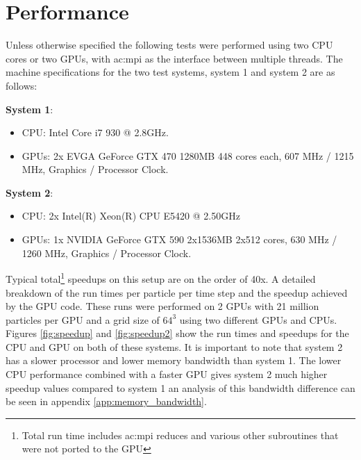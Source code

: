 \chapter{Performance}
\label{ch:performance} 
	Unless otherwise specified the following tests were performed using two CPU cores or two GPUs, with \gls{ac:mpi} as the interface between multiple threads. The machine specifications for the two test systems, system 1 and system 2 are as follows:
\begin{description}
	\item \textbf{System 1}:
			\begin{itemize}
				\item CPU: Intel Core i7 930 @ 2.8GHz.
				\item GPUs: 2x EVGA GeForce GTX 470 1280MB 448 cores each, 607 MHz / 1215 MHz, Graphics / Processor Clock.
			\end{itemize}
	\item \textbf{System 2}:
			\begin{itemize}
				\item CPU: 2x  Intel(R) Xeon(R) CPU E5420 @ 2.50GHz
				\item GPUs: 1x NVIDIA GeForce GTX 590 2x1536MB 2x512 cores, 630 MHz / 1260 MHz, Graphics / Processor Clock.
			\end{itemize}
 
\end{description}



Typical total\footnote[1]{Total run time includes \gls{ac:mpi} reduces and various other subroutines that were not ported to the GPU} speedups on this setup are on the order of 40x. A detailed breakdown of the run times per particle per time step and the speedup achieved by the GPU code. These runs were performed on 2 GPUs with 21 million particles per GPU and a grid size of $64^3$ using two different GPUs and CPUs. Figures \ref{fig:speedup} and \ref{fig:speedup2} show the run times and speedups for the CPU and GPU on both of these systems. It is important to note that system 2 has a slower processor and lower memory bandwidth than system 1. The lower CPU performance combined with a faster GPU gives system 2 much higher speedup values compared to system 1 an analysis of this bandwidth difference can be seen in appendix \ref{app:memory_bandwidth}.

